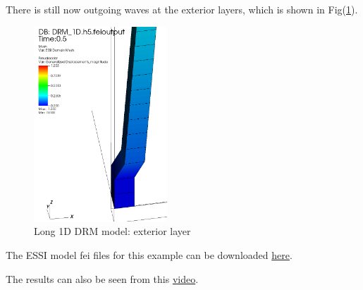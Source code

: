 \documentclass[fleqn,11pt]{article}
\begin{document}
There is still now outgoing waves at the exterior layers, which is shown in Fig(\ref{fig_Long_1D_DRM_model_exterior_layer}).
\begin{figure}[!htb]
  \centering
  \includegraphics[width=5cm]{../Figure-files/_Chapter_Appendix_Illustrative_Examples/long_DRM_part.png}
  \caption{Long 1D DRM model: exterior layer}
  \label{fig_Long_1D_DRM_model_exterior_layer}
\end{figure}


The ESSI model fei files for this example can be downloaded 
\href{https://github.com/BorisJeremic/Real-ESSI-Examples/blob/master/model_fei_file/8NodeBrick_DRM_1D_long/8NodeBrick_DRM_1D_long.tgz?raw=true}{here}.

The results can also be seen from this 
\href{http://sokocalo.engr.ucdavis.edu/~jeremic/lecture_notes_online_material/_Chapter_Applications_Earthquake_Soil_Structure_Interaction_General_Aspects/Animation_DRM_1D.mp4}{video}.














\clearpage  












\end{document}
